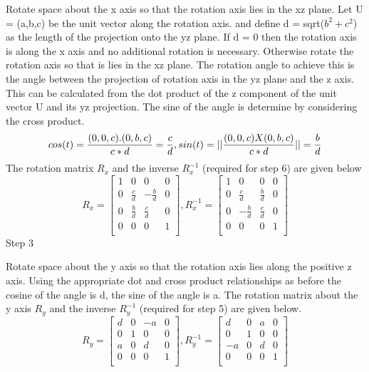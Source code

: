 \documentclass{article}
\begin{document}
Rotate space about the x axis so that the rotation axis lies in the xz plane. Let U = (a,b,c) be the unit vector along the rotation axis. and define d = sqrt($b^{2} + c^{2}$) as the length of the projection onto the yz plane. If d = 0 then the rotation axis is along the x axis and no additional rotation is necessary. Otherwise rotate the rotation axis so that is lies in the xz plane. The rotation angle to achieve this is the angle between the projection of rotation axis in the yz plane and the z axis. This can be calculated from the dot product of the z component of the unit vector U and its yz projection. The sine of the angle is determine by considering the cross product.
\begin{equation}
cos(t)=
\frac{(0,0,c).(0,b,c)} {c*d}= \\
\frac{c} {d},  
sin(t)=
||\frac{(0,0,c)X(0,b,c)} {c*d}||= \\
\frac{b} {d}
\end{equation}
The rotation matrix $R_{x}$ and the inverse $R_{x}^{-1}$ (required for step 6) are given below
\begin{equation}
R_{x}  =
\left[\begin{matrix}
1 & 0 & 0& 0\\
0 & \frac{c} {d} & -\frac{b} {d}& 0\\
0 & \frac{b} {d} &\frac{c} {d} & 0\\
0&0&0&1\\
\end{matrix}\right],
R_{x}^{-1}=
\left[\begin{matrix}
1 & 0 & 0& 0\\
0 & \frac{c} {d} & \frac{b} {d}& 0\\
0 & -\frac{b} {d} &\frac{c} {d} & 0\\
0&0&0&1\\
\end{matrix}\right]
\end{equation}
 Step 3

Rotate space about the y axis so that the rotation axis lies along the positive z axis. Using the appropriate dot and cross product relationships as before the cosine of the angle is d, the sine of the angle is a. The rotation matrix about the y axis $R_{y}$ and the inverse $R_{y}^{-1}$ (required for step 5) are given below.
\begin{equation}
R_{y}  =
\left[\begin{matrix}
d & 0 & -a& 0\\
0 & 1 & 0& 0\\
a & 0&d & 0\\
0&0&0&1\\
\end{matrix}\right],
R_{y}^{-1}=
\left[\begin{matrix}
d & 0 & a& 0\\
0 & 1 & 0& 0\\
-a & 0&d & 0\\
0&0&0&1\\
\end{matrix}\right]
\end{equation}
\end{document}
